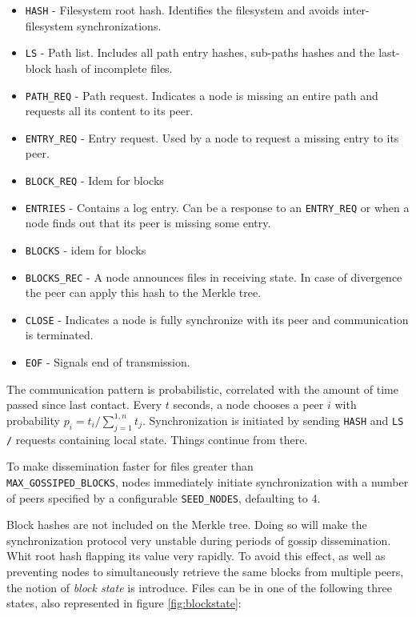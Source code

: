 \documentclass{sig-alternate}
\begin{document}
\begin{itemize}
\item \texttt{HASH} - Filesystem root hash. Identifies the filesystem and avoids inter-filesystem synchronizations. 
\item \texttt{LS} - Path list. Includes all path entry hashes, sub-paths hashes and the last-block hash of incomplete files.
\item \texttt{PATH\_REQ} - Path request. Indicates a node is missing an entire path and requests all its content to its peer.
\item \texttt{ENTRY\_REQ} - Entry request. Used by a node to request a missing entry to its peer.
\item \texttt{BLOCK\_REQ} - Idem for blocks
\item \texttt{ENTRIES} - Contains a log entry. Can be a response to an \texttt{ENTRY\_REQ} or when a node finds out that its peer is missing some entry.
\item \texttt{BLOCKS} - idem for blocks
\item \texttt{BLOCKS\_REC} - A node announces files in receiving state. In case of divergence the peer can apply this hash to the Merkle tree.
\item \texttt{CLOSE} - Indicates a node is fully synchronize with its peer and communication is terminated.
\item \texttt{EOF} - Signals end of transmission.
\end{itemize}

The communication pattern is probabilistic, correlated with the amount of time passed since last contact. Every $t$ seconds, a node chooses a peer $i$ with probability $p_i = t_i/\sum_{j=1}^{1,n} t_j$. Synchronization is initiated by sending \texttt{HASH} and \texttt{LS /} requests containing local state. Things continue from there.

To make dissemination faster for files greater than \\ \texttt{MAX\_GOSSIPED\_BLOCKS}, nodes immediately initiate synchronization with a number of peers specified by a configurable \texttt{SEED\_NODES}, defaulting to 4.

Block hashes are not included on the Merkle tree. Doing so will make the synchronization protocol very unstable during periods of gossip dissemination. Whit root hash flapping its value very rapidly. To avoid this effect, as well as preventing nodes to simultaneously retrieve the same blocks from multiple peers, the notion of \textit{block state} is introduce. Files can be in one of the following three states, also represented in figure \ref{fig:blockstate}:
\end{document}
